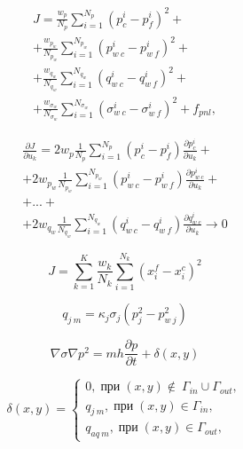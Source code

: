 \documentclass[14pt]{article}
\begin{document}
	\newpage
	
\begin{eqnarray} \label{mse_1}
	J=\frac{w_p}{N_p}\sum_{i=1}^{N_p}{\left(p_c^i-p_f^i\right)^2}+ \\
	 + \frac{w_{p_w}}{N_{p_w}}\sum_{i=1}^{N_{p_w}}{\left(p_{w\:c}^i-p_{w\:f}^i\right)^2} + \\
	+ \frac{w_{q_w}}{N_{q_w}}\sum_{i=1}^{N_{q_w}}{\left(q_{w\:c}^i-q_{w\:f}^i\right)^2} + \\
	 + \frac{w_{\sigma_w}}{N_{\sigma_w}}\sum_{i=1}^{N_{\sigma_w}}{\left(\sigma_{w\:c}^i-\sigma_{w\:f}^i\right)^2} +  f_{pnl},
\end{eqnarray}


\begin{equation}\label{grad}
	\begin{matrix}
	\frac{\partial J}{\partial u_k} = 2w_p \frac{1}{N_p}\sum_{i=1}^{N_p}({p_c^i-p_f^i}) \frac{\partial p_c^i}{\partial	u_k}+ \\	
	+ 2w_{p_w}\frac{1}{N_{p_w}}\sum_{i=1}^{N_{p_w}}({p_{w\:c}^i-p_{w\:f}^i}) \frac{\partial p_{w\:c}^i}{\partial u_k}+ \\
	+ ... + 	\\
		+ 2w_{q_w}\frac{1}{N_{q_w}}\sum_{i=1}^{N_{q_w}}{\left(q_{w\:c}^i-q_{w\:f}^i\right)}\frac{\partial
			q_{w\:c}^i}{\partial u_k} \rightarrow 0
			\end{matrix}
\end{equation}

\begin{equation}
	J = \sum_{k=1}^K \frac{w_k}{N_k}\sum_{i=1}^{N_k}(x_i^f - x_i^c)^2	
\end{equation}

\begin{equation}
	q_{j \:m} = \kappa_j\sigma_j(p_j^2-p_{w\:j}^2)
\end{equation}

\begin{equation}
	\nabla \sigma \nabla p^2= m h \frac{\partial p}{\partial t} + \delta(x,y)
\end{equation}

\begin{equation} \label{bc}
	\delta(x,y)  = \left\{\begin{array}{crl}
		0, \;\mbox{при}\;(x,y) \notin\ \Gamma_{in}\cup\Gamma_{out},\\
		q_{j\:m}, \;\mbox{при}\;(x,y) \in \Gamma_{in},\\
		q_{aq \: m}, \;\mbox{при}\;(x,y) \in \Gamma_{out},
	\end{array}\right.
\end{equation}
\end{document}
